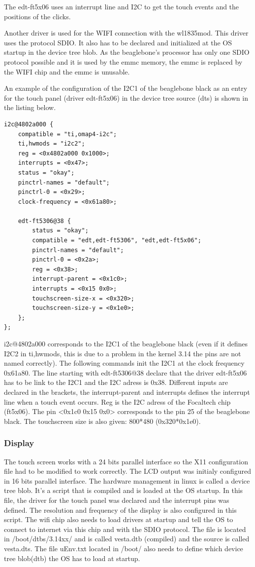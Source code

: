 The edt-ft5x06 uses an interrupt line and I2C to get the touch events and the positions of the clicks.

Another driver is used for the WIFI connection with the wl1835mod. This driver uses the protocol SDIO. It also has to be declared and initialized at the OS startup in the device tree blob. As the beaglebone's processor has only one SDIO protocol possible and it is used by the emmc memory, the emmc is replaced by the WIFI chip and the emmc is unusable.

An example of the configuration of the I2C1 of the beaglebone black as an entry for the touch panel (driver edt-ft5x06) in the device tree source (dts) is shown in the listing below.

\begin{lstlisting}
i2c@4802a000 {
	compatible = "ti,omap4-i2c";
	ti,hwmods = "i2c2";
	reg = <0x4802a000 0x1000>;
	interrupts = <0x47>;
	status = "okay";
	pinctrl-names = "default";
	pinctrl-0 = <0x29>;
	clock-frequency = <0x61a80>;

	edt-ft5306@38 {
		status = "okay";
		compatible = "edt,edt-ft5306", "edt,edt-ft5x06";
		pinctrl-names = "default";
		pinctrl-0 = <0x2a>;
		reg = <0x38>;
		interrupt-parent = <0x1c0>;
		interrupts = <0x15 0x0>;
		touchscreen-size-x = <0x320>;
		touchscreen-size-y = <0x1e0>;
	};
};
\end{lstlisting}

i2c@4802a000 corresponds to the I2C1 of the beaglebone black (even if it defines I2C2 in ti,hwmods, this is due to a problem in the kernel 3.14 the pins are not named correctly). The following commands init the I2C1 at the clock frequency 0x61a80. The line starting with edt-ft5306@38 declare that the driver edt-ft5x06 has to be link to the I2C1 and the I2C adress is 0x38. Different inputs are declared in the brackets, the interrupt-parent and interrupts defines the interrupt line when a touch event occurs. Reg is the I2C adress of the Focaltech chip (ft5x06). The pin <0x1c0 0x15 0x0> corresponds to the pin 25 of the beaglebone black. The touchscreen size is also given: 800*480 (0x320*0x1e0).

\clearpage

\subsubsection{Display}
The touch screen works with a 24 bits parallel interface so the X11 configuration file had to be modified to work correctly. The LCD output was initialy configured in 16 bits parallel interface.
The hardware management in linux is called a device tree blob. It’s a script that is compiled and is loaded at the OS startup. In this file, the driver for the touch panel was declared and the interrupt pins was defined. The resolution and frequency of the display is also configured in this script. The wifi chip also needs to load drivers at startup and tell the OS to connect to internet via this chip and with the SDIO protocol.
The file is located in /boot/dtbs/3.14xx/ and is called vesta.dtb (compiled) and the source is called vesta.dts. The file uEnv.txt located in /boot/ also needs to define which device tree blob(dtb) the OS has to load at startup.

